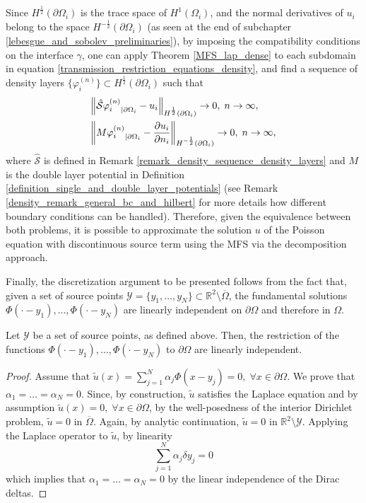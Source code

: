 Since \(H^\frac{1}{2}(\partial \Omega_i)\) is the trace space of \(H^1(\Omega_i)\), and the normal derivatives of \(u_i\) belong to the space \(H^{-\frac{1}{2}}(\partial\Omega_i)\) (as seen at the end of subchapter \ref{lebesgue_and_sobolev_preliminaries}), by imposing the compatibility conditions on the interface \(\gamma\), one can apply Theorem \ref{MFS_lap_dense} to each subdomain in equation \eqref{transmission_restriction_equations_density}, and find a sequence of density layers \(\{\varphi^{(n)}_i\} \subset H^{\frac{1}{2}}(\partial\Omega_i)\) such that
\begin{align*}
    &\norm{{\hat{\mathcal{S}}\varphi^{(n)}_i}_{|\partial\Omega_i} - u_i}_{H^\frac{1}{2}(\partial\Omega_i)} \rightarrow 0, \; n \rightarrow \infty,\\
    &\norm{{M\varphi^{(n)}_i}_{|\partial\Omega_i} - \frac{\partial u_i}{\partial n_i}}_{H^{-\frac{1}{2}}(\partial\Omega_i)} \rightarrow 0, \; n \rightarrow \infty,
\end{align*}
where \(\hat{\mathcal{S}}\) is defined in Remark \ref{remark_density_sequence_density_layers} and \(M\) is the double layer potential in Definition \ref{definition_single_and_double_layer_potentials} (see Remark \ref{density_remark_general_bc_and_hilbert} for more details how different boundary conditions can be handled). Therefore, given the equivalence between both problems, it is possible to approximate the solution \(u\) of the Poisson equation with discontinuous source term using the \ac{MFS} via the decomposition approach.

Finally, the discretization argument to be presented follows from the fact that, given a set of source points \(\mathcal{Y} = \{y_1,\dots, y_N\} \subset \mathbb{R}^2\setminus\overline{\Omega}\), the fundamental solutions \(\Phi(\cdot-y_1),\dots,\Phi(\cdot-y_N)\) are linearly independent on \(\partial \Omega\) and therefore in \(\Omega\).
\begin{theorem}\label{lapl_li}
    Let \(\mathcal{Y}\) be a set of source points, as defined above. Then, the restriction of the functions \(\Phi(\cdot-y_1),\dots,\Phi(\cdot-y_N)\) to \(\partial\Omega\) are linearly independent.
\end{theorem}
\begin{proof}
    Assume that \(\tilde{u}(x) = \sum_{j=1}^{N}\alpha_j \Phi(x-y_j) = 0, \; \forall x \in \partial\Omega\). We prove that \(\alpha_1=\dots=\alpha_N = 0\). Since, by construction, \(\tilde{u}\) satisfies the Laplace equation and by assumption \(\tilde{u}(x) = 0, \; \forall x \in \partial\Omega\), by the well-posedness of the interior Dirichlet problem, \(\tilde{u} = 0\) in \(\overline{\Omega}\). Again, by analytic continuation, \(\tilde{u} = 0\) in \(\mathbb{R}^2\setminus\mathcal{Y}\). Applying the Laplace operator to \(\tilde{u}\), by linearity
    \[
        \sum_{j=1}^{N}\alpha_j \delta{y_j} = 0
    \]
    which implies that \(\alpha_1=\dots=\alpha_N = 0\) by the linear independence of the Dirac deltas.
\end{proof}

